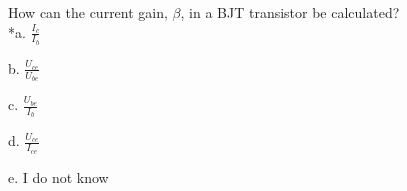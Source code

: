 
How can the current gain, $\beta$, in a BJT transistor be calculated? \\

*a. \( \frac{I_c}{I_b}  \)

b. \( \frac{U_{ce}}{U_{be}} \)

c. \( \frac{U_{be}}{I_{b}} \)

d. \( \frac{U_{ce}}{I_{ce}} \)

e. I do not know \\ 
